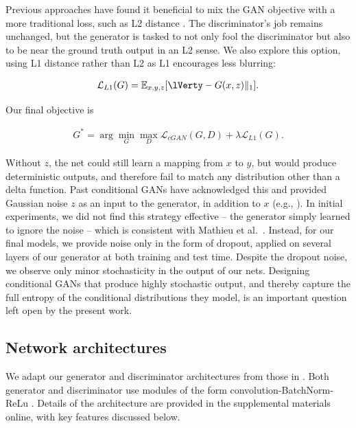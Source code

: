 Previous approaches have found it beneficial to mix the GAN objective with a more traditional loss, such as L2 distance \cite{pathak2016context}. The discriminator's job remains unchanged, but the generator is tasked to not only fool the discriminator but also to be near the ground truth output in an L2 sense. We also explore this option, using L1 distance rather than L2 as L1 encourages less blurring:

\begin{align}
    \mathcal{L}_{L1}(G) = \mathbb{E}_{x,y,z}[\lVerty-G(x,z)\rVert_1].\label{L1_equation}
\end{align}

Our final objective is

\begin{align}
    G^*  = \arg\min_G\max_D \mathcal{L}_{cGAN}(G,D) + \lambda \mathcal{L}_{L1}(G).\label{full_objective}
\end{align}

Without $z$, the net could still learn a mapping from $x$ to $y$, but would produce deterministic outputs, and therefore fail to match any distribution other than a delta function. Past conditional GANs have acknowledged this and provided Gaussian noise $z$ as an input to the generator, in addition to $x$ (e.g., \cite{wang2016generative}). In initial experiments, we did not find this strategy effective -- the generator simply learned to ignore the noise -- which is consistent with Mathieu et al.~\cite{mathieu2015deep}. Instead, for our final models, we provide noise only in the form of dropout, applied on several layers of our generator at both training and test time. Despite the dropout noise, we observe only minor stochasticity in the output of our nets. Designing conditional GANs that produce highly stochastic output, and thereby capture the full entropy of the conditional distributions they model, is an important question left open by the present work.

\subsection{Network architectures}

We adapt our generator and discriminator architectures from those in \cite{radford2015unsupervised}. Both generator and discriminator use modules of the form convolution-BatchNorm-ReLu \cite{ioffe2015batch}. Details of the architecture are provided in the supplemental materials online, with key features discussed below.

